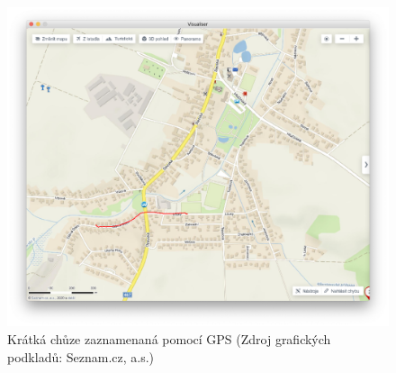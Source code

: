 \documentclass[czech, bachelor]{diploma}
\begin{document}
\begin{figure}
    \centering
    \includegraphics[width=1\textwidth]{Figures/olsinapesky.png}
    \caption{Krátká chůze zaznamenaná pomocí GPS (Zdroj grafických podkladů: Seznam.cz, a.s.)}
    \label{fig:olsinapesky-fullsize}
\end{figure}
\end{document}
